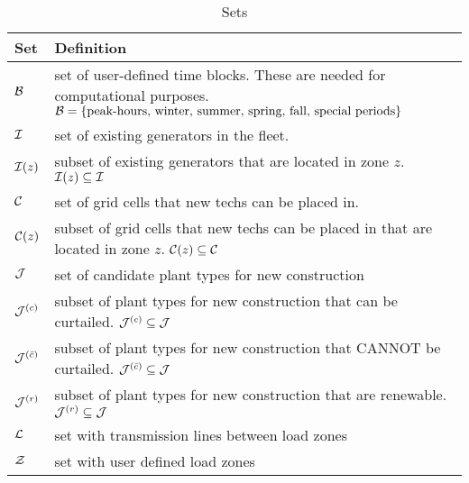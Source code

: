 \documentclass[11pt, oneside]{article}   	%
\newcommand{\bc}{\bar{c}}
\begin{document}
\begin{table}[H]
   \centering
   \caption{Sets}
   \begin{tabular}{p{1in} p{4in} } %
      \toprule
      \textbf{Set} & \textbf{Definition} \\
      \midrule
      $\mathcal{B}$ & set of user-defined time blocks. These are needed for computational purposes. $\mathcal{B} = \{\text{peak-hours, winter, summer, spring, fall, special periods}\}$ \\
      $\mathcal{I}$ & set of existing generators in the fleet. \\
      $\mathcal{I} (z)$ & subset of existing generators that are located in zone $z$.  $\mathcal{I} (z) \subseteq \mathcal{I}$\\
      $\mathcal{C}$ & set of grid cells that new techs can be placed in. \\
      $\mathcal{C} (z)$ & subset of grid cells that new techs can be placed in that are located in zone $z$. $\mathcal{C} (z) \subseteq \mathcal{C}$\\
      $\mathcal{J}$ & set of candidate plant types for new construction \\
      $\mathcal{J}^{(c)}$ & subset of plant types for new construction that can be curtailed. $\mathcal{J}^{(c)} \subseteq \mathcal{J}$\\
      $\Jc^{(\bc)}$ & subset of plant types for new construction that CANNOT be curtailed. $\Jc^{(\bc)} \subseteq \Jc$\\
      $\mathcal{J}^{(r)}$ & subset of plant types for new construction that are renewable. $\mathcal{J}^{(r)} \subseteq \mathcal{J}$\\
      $\mathcal{L}$ & set with transmission lines between load zones \\
      $\mathcal{Z}$ & set with user defined load zones \\
      \bottomrule
   \end{tabular}
   \label{tab:sets}
\end{table}
\end{document}
